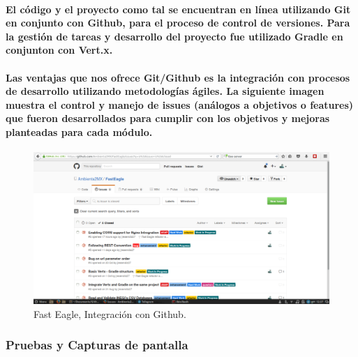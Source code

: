       \paragraph{El código y el proyecto como tal se encuentran en línea utilizando Git\cite{38} en conjunto con Github\cite{39}, para el proceso de control de versiones. Para la gestión de tareas y desarrollo del proyecto fue utilizado Gradle en conjunton con Vert.x.}
      \paragraph{Las ventajas que nos ofrece Git/Github es la integración con procesos de desarrollo utilizando metodologías ágiles. La siguiente imagen muestra el control y manejo de issues (análogos a objetivos o features) que fueron desarrollados para cumplir con los objetivos y mejoras planteadas para cada módulo.}
      \begin{figure}[h!]
          \centering
            \includegraphics[width=\textwidth]{./images/FastEagleIssues.png}
            \caption{Fast Eagle, Integración con Github.}
      \end{figure}
    \subsubsection{Pruebas y Capturas de pantalla}
